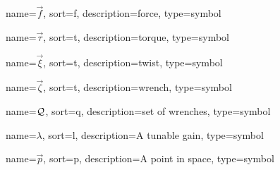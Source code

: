 	{%
		name=\ensuremath{\vec{f}},
		sort=f,
		description=force,
		type=symbol
	}
	\newcommand{\force}{\gls{sym:force}}

	{%
		name=\ensuremath{\vec{\tau}},
		sort=t,
		description=torque,
		type=symbol
	}
	\newcommand{\torque}{\gls{sym:torque}}

	{%
		name=\ensuremath{\vec{\xi}},
		sort=t,
		description=twist,
		type=symbol
	}
	\newcommand{\twist}{\gls{sym:twist}}

	{%
		name=\ensuremath{\vec{\zeta}},
		sort=t,
		description=wrench,
		type=symbol
	}
	\newcommand{\wrench}{\gls{sym:wrench}}

	{%
		name=\ensuremath{\set{Q}},
		sort=q,
		description=set of wrenches,
		type=symbol
	}
	\newcommand{\setofwrenches}{\gls{sym:setofwrenches}}

	{%
		name={\ensuremath{\lambda}},
		sort=l,
		description=A tunable gain,
		type=symbol
	}
	\newcommand{\gain}{\gls{sym:gain}}

	{%
		name={\ensuremath{\vec{p}}},
		sort=p,
		description=A point in space,
		type=symbol
	}
	\newcommand{\point}{\gls{sym:point}}


